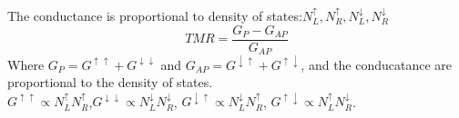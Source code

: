 \documentclass[12pt,a4paper,bold]{thesis}
\theoremstyle{thm}
\theoremstyle{definition}
\begin{document}
The conductance is proportional to density of states:$N_L^{\uparrow},N_R^{\uparrow},N_L^{\downarrow},N_R^{\downarrow}$\\
\[TMR=\frac{G_P-G_{AP}}{G_{AP}}\]
Where $G_P=G^{\uparrow \uparrow}+G^{\downarrow \downarrow}$ and $G_{AP}=G^{\downarrow \uparrow}+G^{\uparrow \downarrow}$, and the conducatance are proportional to the density of states.\\
$G^{\uparrow \uparrow} \propto N_L^{\uparrow}N_R^{\uparrow}$,\indent $G^{\downarrow \downarrow} \propto N_L^{\downarrow}N_R^{\downarrow}$,
\indent $G^{\downarrow \uparrow} \propto N_L^{\downarrow}N_R^{\uparrow}$,
\indent $G^{\uparrow \downarrow} \propto N_L^{\uparrow}N_R^{\downarrow}$.

\pagebreak
\end{document}
